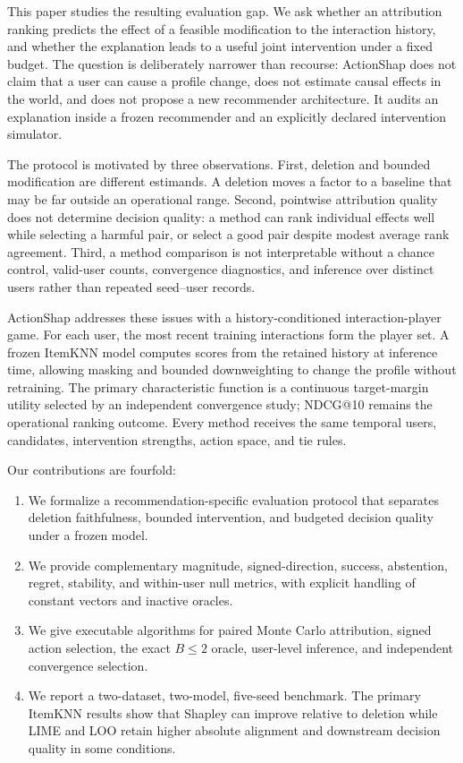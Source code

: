 \documentclass[pdflatex,sn-basic,Numbered]{sn-jnl}
\begin{document}
This paper studies the resulting evaluation gap. We ask whether an attribution ranking predicts the effect of a feasible modification to the interaction history, and whether the explanation leads to a useful joint intervention under a fixed budget. The question is deliberately narrower than recourse: ActionShap does not claim that a user can cause a profile change, does not estimate causal effects in the world, and does not propose a new recommender architecture. It audits an explanation inside a frozen recommender and an explicitly declared intervention simulator.

The protocol is motivated by three observations. First, deletion and bounded modification are different estimands. A deletion moves a factor to a baseline that may be far outside an operational range. Second, pointwise attribution quality does not determine decision quality: a method can rank individual effects well while selecting a harmful pair, or select a good pair despite modest average rank agreement. Third, a method comparison is not interpretable without a chance control, valid-user counts, convergence diagnostics, and inference over distinct users rather than repeated seed--user records.

ActionShap addresses these issues with a history-conditioned interaction-player game. For each user, the most recent training interactions form the player set. A frozen ItemKNN model computes scores from the retained history at inference time, allowing masking and bounded downweighting to change the profile without retraining. The primary characteristic function is a continuous target-margin utility selected by an independent convergence study; NDCG@10 remains the operational ranking outcome. Every method receives the same temporal users, candidates, intervention strengths, action space, and tie rules.

Our contributions are fourfold:
\begin{enumerate}
  \item We formalize a recommendation-specific evaluation protocol that separates deletion faithfulness, bounded intervention, and budgeted decision quality under a frozen model.
  \item We provide complementary magnitude, signed-direction, success, abstention, regret, stability, and within-user null metrics, with explicit handling of constant vectors and inactive oracles.
  \item We give executable algorithms for paired Monte Carlo attribution, signed action selection, the exact $B\le2$ oracle, user-level inference, and independent convergence selection.
  \item We report a two-dataset, two-model, five-seed benchmark. The primary ItemKNN results show that Shapley can improve relative to deletion while LIME and LOO retain higher absolute alignment and downstream decision quality in some conditions.
\end{enumerate}
\end{document}
